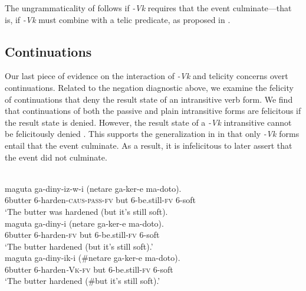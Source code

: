 \documentclass[output=paper]{langsci/langscibook}
\begin{document}
The ungrammaticality of  follows if \textit{-Vk} requires that the event culminate—that is, if \textit{-Vk} must combine with a telic predicate, as proposed in .

\subsection{Continuations}

Our last piece of evidence on the interaction of \textit{-Vk} and telicity concerns overt continuations. Related to the negation diagnostic above, we examine the felicity of continuations that deny the result state of an intransitive verb form. We find that continuations of both the passive  and plain intransitive  forms are felicitous if the result state is denied. However, the result state of a \textit{-Vk} intransitive cannot be felicitously denied . This supports the generalization in  in that only \textit{-Vk} forms entail that the event culminate. As a result, it is infelicitous to later assert that the event did not culminate.

\ea\label{exx:}
\ea
{}\\
\gll maguta  ga-diny-iz-w-i                     (netare ga-ker-e       ma-doto).\\
     6butter  6-harden-\textsc{caus}-\textsc{pass}-\textsc{fv}       but      6-be.still-\textsc{fv} 6-soft\\
\glt ‘The butter was hardened (but it’s still soft).
\ex
{}\\
\gll maguta ga-diny-i      (netare ga-ker-e       ma-doto).\\
     6butter 6-harden-\textsc{fv}   but     6-be.still-\textsc{fv}  6-soft\\
\glt ‘The butter hardened (but it’s still soft).’
\ex
{}\\
\gll maguta ga-diny-ik-i        (\#netare ga-ker-e       ma-doto).\\
     6butter 6-harden\textit{-}\textsc{Vk}-\textsc{fv}     but      6-be.still-\textsc{fv} 6-soft\\
\glt ‘The butter hardened (\#but it’s still soft).’
\z
\z
\end{document}
